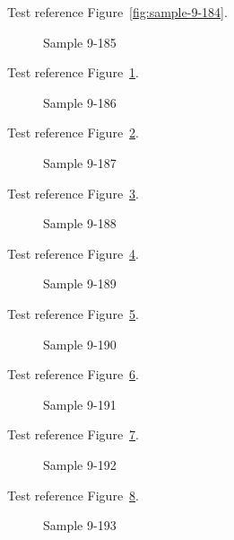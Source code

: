Test reference Figure~\ref{fig:sample-9-184}.

\begin{figure}[tbhp]
\caption{Sample 9-185}
\label{fig:sample-9-185}
\end{figure}

Test reference Figure~\ref{fig:sample-9-185}.

\begin{figure}[tbhp]
\caption{Sample 9-186}
\label{fig:sample-9-186}
\end{figure}

Test reference Figure~\ref{fig:sample-9-186}.

\begin{figure}[tbhp]
\caption{Sample 9-187}
\label{fig:sample-9-187}
\end{figure}

Test reference Figure~\ref{fig:sample-9-187}.

\begin{figure}[tbhp]
\caption{Sample 9-188}
\label{fig:sample-9-188}
\end{figure}

Test reference Figure~\ref{fig:sample-9-188}.

\begin{figure}[tbhp]
\caption{Sample 9-189}
\label{fig:sample-9-189}
\end{figure}

Test reference Figure~\ref{fig:sample-9-189}.

\begin{figure}[tbhp]
\caption{Sample 9-190}
\label{fig:sample-9-190}
\end{figure}

Test reference Figure~\ref{fig:sample-9-190}.

\begin{figure}[tbhp]
\caption{Sample 9-191}
\label{fig:sample-9-191}
\end{figure}

Test reference Figure~\ref{fig:sample-9-191}.

\begin{figure}[tbhp]
\caption{Sample 9-192}
\label{fig:sample-9-192}
\end{figure}

Test reference Figure~\ref{fig:sample-9-192}.

\begin{figure}[tbhp]
\caption{Sample 9-193}
\label{fig:sample-9-193}
\end{figure}

